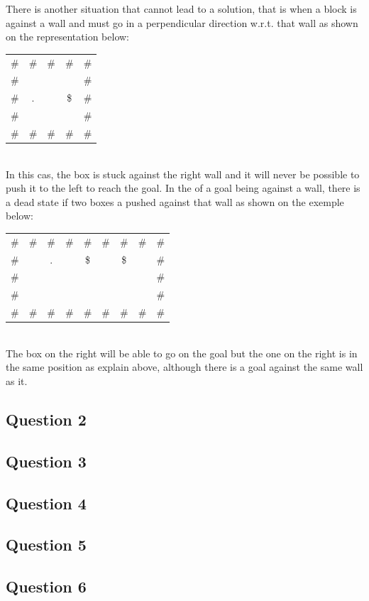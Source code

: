 \documentclass[a4paper,10pt]{article}
\begin{document}
			There is another situation that cannot lead to a solution, that is when a block is against a wall and must go in a perpendicular direction w.r.t. that wall as shown on the representation below: \\
	\begin{tabular}{ccccc}
		\# & \# & \# & \# & \# \\ 
		\# &    &    &    & \# \\ 
		\# & .  &    & \$ & \# \\ 
		\# &    &    &    & \# \\ 
		\# & \# & \# & \# & \# \\ 
	\end{tabular}\\
	In this cas, the box is stuck against the right wall and it will never be possible to push it to the left to reach the goal.
	In the of a goal being against a wall, there is a dead state if two boxes a pushed against that wall as shown on the exemple below: \\
	\begin{tabular}{ccccccccc}
		\# & \# & \# & \# & \# & \# & \# & \# & \# \\ 
		\# &    & .  &    & \$ &    & \$ &    & \# \\ 
		\# &    &    &    &    &    &    &    & \# \\ 
		\# &    &    &    &    &    &    &    & \# \\ 
		\# & \# & \# & \# & \# & \# & \# & \# & \# \\ 
	\end{tabular}\\
	The box on the right will be able to go on the goal but the one on the right is in the same position as explain above, although there is a goal against the same wall as it.
		
		\subsection{Question 2}
		
		\subsection{Question 3}
		
		\subsection{Question 4}
		
		\subsection{Question 5}
		
		\subsection{Question 6}
		
\end{document}
